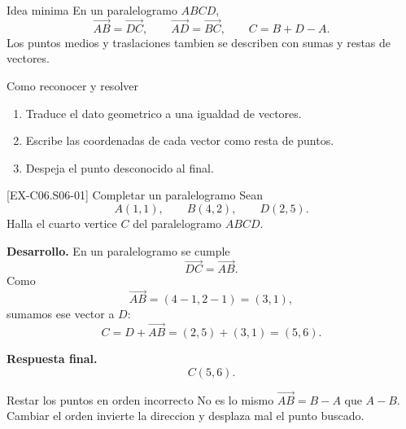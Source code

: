 \begin{theorybox}{Idea minima}
En un paralelogramo \(ABCD\),
\[
\overrightarrow{AB}=\overrightarrow{DC},
\qquad
\overrightarrow{AD}=\overrightarrow{BC},
\qquad
C=B+D-A.
\]
Los puntos medios y traslaciones tambien se describen con sumas y restas de vectores.

\begin{center}
\end{center}
\end{theorybox}

\begin{methodbox}{Como reconocer y resolver}
\begin{enumerate}
  \item Traduce el dato geometrico a una igualdad de vectores.
  \item Escribe las coordenadas de cada vector como resta de puntos.
  \item Despeja el punto desconocido al final.
\end{enumerate}
\end{methodbox}

\begin{solvedexample}{[EX-C06.S06-01] Completar un paralelogramo}
Sean
\[
A(1,1),\qquad B(4,2),\qquad D(2,5).
\]
Halla el cuarto vertice \(C\) del paralelogramo \(ABCD\).

\textbf{Desarrollo.} En un paralelogramo se cumple
\[
\overrightarrow{DC}=\overrightarrow{AB}.
\]
Como
\[
\overrightarrow{AB}=(4-1,2-1)=(3,1),
\]
sumamos ese vector a \(D\):
\[
C=D+\overrightarrow{AB}=(2,5)+(3,1)=(5,6).
\]

\textbf{Respuesta final.}
\[
C(5,6).
\]
\end{solvedexample}

\begin{commonerror}{Restar los puntos en orden incorrecto}
No es lo mismo \(\overrightarrow{AB}=B-A\) que \(A-B\). Cambiar el orden invierte la
direccion y desplaza mal el punto buscado.
\end{commonerror}


